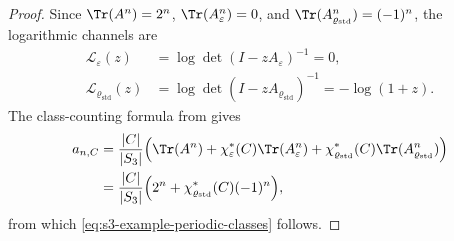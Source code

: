 \begin{proof}
  Since \(\Tr(A^n)=2^n\), \(\Tr(A_\varepsilon^n)=0\), and
  \(\Tr(A_{\varrho_{\mathrm{std}}}^n)=(-1)^n\), the logarithmic channels are
  \[
  \begin{aligned}
    \mathcal L_\varepsilon(z)
      &=\log\det(I-zA_\varepsilon)^{-1}=0,\\
    \mathcal L_{\varrho_{\mathrm{std}}}(z)
      &=\log\det(I-zA_{\varrho_{\mathrm{std}}})^{-1}=-\log(1+z).
  \end{aligned}
  \]
  The class-counting formula from
   gives
  \[
    \begin{aligned}
      a_{n,C}
      &=
      \frac{|C|}{|S_3|}
        \Bigl(
          \Tr(A^n)
          +\chi_\varepsilon^\ast(C)\Tr(A_\varepsilon^n)
          +\chi_{\varrho_{\mathrm{std}}}^\ast(C)\Tr(A_{\varrho_{\mathrm{std}}}^n)
        \Bigr) \\
      &=
      \frac{|C|}{|S_3|}
        \Bigl(2^n+\chi_{\varrho_{\mathrm{std}}}^\ast(C)(-1)^n\Bigr),
    \end{aligned}
  \]
  from which \eqref{eq:s3-example-periodic-classes} follows.
\end{proof}

